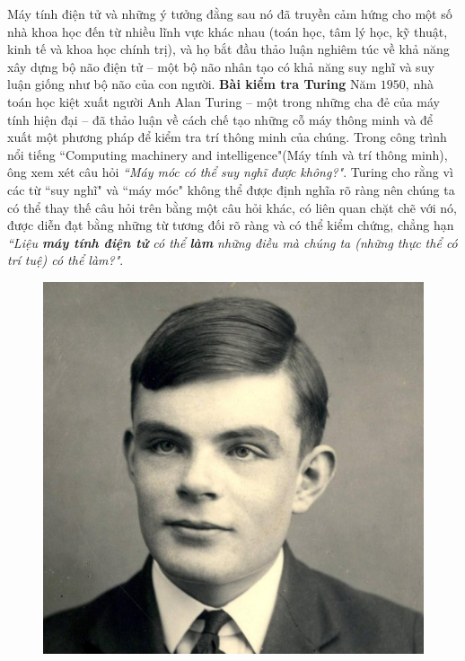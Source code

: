 \begin{multicols}{2}
	\vskip 0.1cm
	Máy tính điện tử và những ý tưởng đằng sau nó đã truyền cảm hứng cho một số nhà khoa học đến từ nhiều lĩnh vực khác nhau (toán học, tâm lý học, kỹ thuật, kinh tế và khoa học chính trị), và họ bắt đầu thảo luận nghiêm túc về khả năng xây dựng  bộ não điện tử -- một bộ não nhân tạo có khả năng suy nghĩ và suy luận giống như bộ não của con người.
	\vskip 0.1cm
	\textbf{\color{cackithi}Bài kiểm tra Turing}
	\vskip 0.1cm
	Năm $1950$, nhà toán học kiệt xuất người Anh Alan Turing -- một trong những cha đẻ của máy tính hiện đại -- đã thảo luận về cách chế tạo những cỗ máy thông minh và để xuất một phương pháp để kiểm tra trí thông minh của chúng. Trong công trình nổi tiếng ``Computing machinery and
	intelligence"(Máy tính và trí thông minh), ông xem xét câu hỏi \textit{``Máy móc có thể suy nghĩ được không?"}. Turing cho rằng vì các từ ``suy nghĩ" và ``máy móc" không thể được định nghĩa rõ ràng nên chúng ta có thể thay thế câu hỏi trên bằng một câu hỏi khác, có liên quan chặt chẽ với nó, được diễn đạt bằng những từ tương đối rõ ràng và có thể kiểm chứng, chẳng hạn \textit{``Liệu \textbf{\color{cackithi}máy tính điện tử} có thể \textbf{\color{cackithi}làm} những điều mà chúng ta (những thực thể có trí tuệ) có thể làm?"}.
	\begin{figure}[H]
		\vspace*{-5pt}
		\centering
		\captionsetup{labelformat= empty, justification=centering}
		\includegraphics[width= 1\linewidth]{Alan-Turing.jpg}

\end{figure}
\end{multicols}
